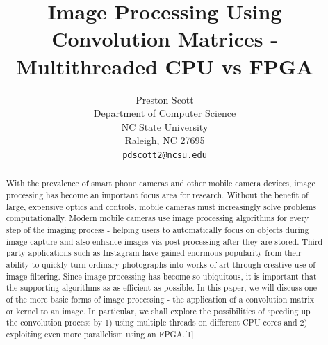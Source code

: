 \documentclass{article} %
\title{Image Processing Using Convolution Matrices - Multithreaded CPU vs FPGA}
\author{
Preston Scott\\
Department of Computer Science\\
NC State University\\
Raleigh, NC 27695 \\
\texttt{pdscott2@ncsu.edu} \\
}
\begin{document}
\maketitle

\begin{abstract}
With the prevalence of smart phone cameras and other mobile camera devices, image processing has become an important focus area for research.  Without the benefit of large, expensive optics and controls, mobile cameras must increasingly solve problems computationally. Modern mobile cameras use image processing algorithms for every step of the imaging process - helping users to automatically focus on objects during image capture and also enhance images via post processing after they are stored. Third party applications such as Instagram have gained enormous popularity from their ability to quickly turn ordinary photographs into works of art through creative use of image filtering. Since image processing has become so ubiquitous, it is important that the supporting algorithms as as efficient as possible.  In this paper, we will discuss one of the more basic forms of image processing - the application of a convolution matrix or kernel to an image. In particular, we shall explore the possibilities of speeding up the convolution process by 1) using multiple threads on different CPU cores and 2) exploiting even more parallelism using an FPGA.[1]   

\end{abstract}
\end{document}
